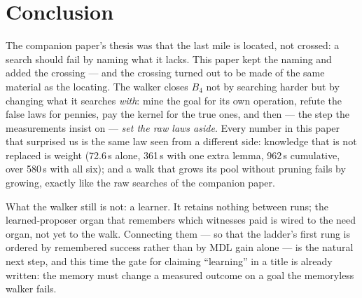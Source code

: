 \documentclass[11pt]{article}
\theoremstyle{remark}\newtheorem{remark}{Remark}
\begin{document}
\section{Conclusion}
\label{sec:conclusion}

The companion paper's thesis was that the last mile is located, not crossed:
a search should fail by naming what it lacks. This paper kept the naming and
added the crossing --- and the crossing turned out to be made of the same
material as the locating. The walker closes $B_4$ not by searching harder but
by changing what it searches \emph{with}: mine the goal for its own
operation, refute the false laws for pennies, pay the kernel for the true
ones, and then --- the step the measurements insist on --- \emph{set the raw
laws aside}. Every number in this paper that surprised us is the same law
seen from a different side: knowledge that is not replaced is weight
(72.6\,s alone, 361\,s with one extra lemma, 962\,s cumulative, over 580\,s
with all six); and a walk that grows its pool without pruning fails by
growing, exactly like the raw searches of the companion paper.

What the walker still is not: a learner. It retains nothing between runs;
the learned-proposer organ that remembers which witnesses paid is wired to
the need organ, not yet to the walk. Connecting them --- so that the ladder's
first rung is ordered by remembered success rather than by MDL gain alone
--- is the natural next step, and this time the gate for claiming
``learning'' in a title is already written: the memory must change a
measured outcome on a goal the memoryless walker fails.



\end{document}
